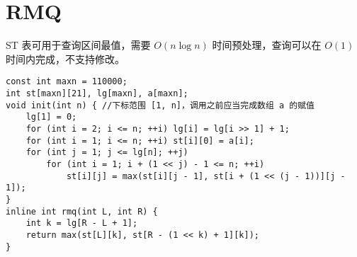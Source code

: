 \section{RMQ}
\par \noindent ST 表可用于查询区间最值，需要 $O(n\log n)$ 时间预处理，查询可以在 $O(1)$ 时间内完成，不支持修改。
\begin{verbatim}
const int maxn = 110000;
int st[maxn][21], lg[maxn], a[maxn];
void init(int n) { //下标范围 [1, n]，调用之前应当完成数组 a 的赋值
    lg[1] = 0;
    for (int i = 2; i <= n; ++i) lg[i] = lg[i >> 1] + 1;
    for (int i = 1; i <= n; ++i) st[i][0] = a[i];
    for (int j = 1; j <= lg[n]; ++j)
        for (int i = 1; i + (1 << j) - 1 <= n; ++i)
            st[i][j] = max(st[i][j - 1], st[i + (1 << (j - 1))][j - 1]);
}
inline int rmq(int L, int R) {
    int k = lg[R - L + 1];
    return max(st[L][k], st[R - (1 << k) + 1][k]);
}
\end{verbatim}